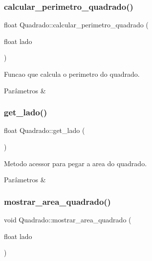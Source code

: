 \subsubsection{\texorpdfstring{calcular\+\_\+perimetro\+\_\+quadrado()}{calcular\_perimetro\_quadrado()}}
{\footnotesize\ttfamily float Quadrado\+::calcular\+\_\+perimetro\+\_\+quadrado (\begin{DoxyParamCaption}\item[{float}]{lado }\end{DoxyParamCaption})}



Funcao que calcula o perimetro do quadrado. 


\begin{DoxyParams}{Parâmetros}
{\em } & \\
\hline
\end{DoxyParams}
\mbox{\label{classQuadrado_a53cc7321dc6a0f4d17953194a2d1dd2c}} 
\subsubsection{\texorpdfstring{get\+\_\+lado()}{get\_lado()}}
{\footnotesize\ttfamily float Quadrado\+::get\+\_\+lado (\begin{DoxyParamCaption}{ }\end{DoxyParamCaption})}



Metodo acessor para pegar a area do quadrado. 


\begin{DoxyParams}{Parâmetros}
{\em } & \\
\hline
\end{DoxyParams}
\mbox{\label{classQuadrado_a4e4c451229d5baf10ba952248d944eaa}} 
\subsubsection{\texorpdfstring{mostrar\+\_\+area\+\_\+quadrado()}{mostrar\_area\_quadrado()}}
{\footnotesize\ttfamily void Quadrado\+::mostrar\+\_\+area\+\_\+quadrado (\begin{DoxyParamCaption}\item[{float}]{lado }\end{DoxyParamCaption})}



